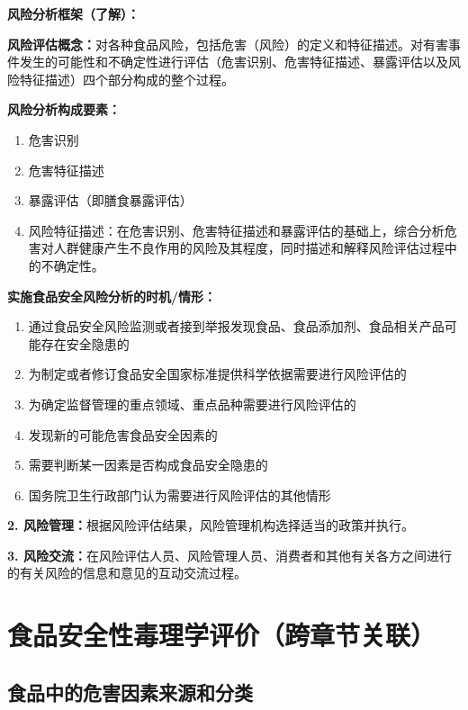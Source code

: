 \begin{defbox}
\textbf{风险分析框架（了解）：}

\textbf{风险评估概念：}对各种食品风险，包括危害（风险）的定义和特征描述。对有害事件发生的可能性和不确定性进行评估（危害识别、危害特征描述、暴露评估以及风险特征描述）四个部分构成的整个过程。

\textbf{风险分析构成要素：}
\begin{enumerate}[leftmargin=*]
    \item 危害识别
    \item 危害特征描述
    \item 暴露评估（即膳食暴露评估）
    \item 风险特征描述：在危害识别、危害特征描述和暴露评估的基础上，综合分析危害对人群健康产生不良作用的风险及其程度，同时描述和解释风险评估过程中的不确定性。
\end{enumerate}

\textbf{实施食品安全风险分析的时机/情形：}
\begin{enumerate}[leftmargin=*]
    \item 通过食品安全风险监测或者接到举报发现食品、食品添加剂、食品相关产品可能存在安全隐患的
    \item 为制定或者修订食品安全国家标准提供科学依据需要进行风险评估的
    \item 为确定监督管理的重点领域、重点品种需要进行风险评估的
    \item 发现新的可能危害食品安全因素的
    \item 需要判断某一因素是否构成食品安全隐患的
    \item 国务院卫生行政部门认为需要进行风险评估的其他情形
\end{enumerate}

\textbf{2. 风险管理：}根据风险评估结果，风险管理机构选择适当的政策并执行。

\textbf{3. 风险交流：}在风险评估人员、风险管理人员、消费者和其他有关各方之间进行的有关风险的信息和意见的互动交流过程。
\end{defbox}

\section{食品安全性毒理学评价（跨章节关联）}

\subsection{食品中的危害因素来源和分类}

